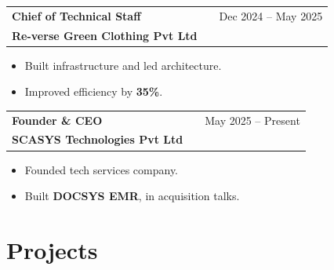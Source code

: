 \documentclass[a4paper,10pt]{article}
\begin{document}
\begin{tabularx}{\linewidth}{ @{}l X r@{} }

\textbf{Chief of Technical Staff} & \hfill & {\color[HTML]{371e77} Dec 2024 -- May 2025} \\

{\color[HTML]{371e77} \textbf{Re-verse Green Clothing Pvt Ltd}} & & \\

\end{tabularx}



\vspace{-6pt}

\begin{itemize}[nosep, leftmargin=1.5em]

\item Built infrastructure and led architecture.

\item Improved efficiency by \textbf{35\%}.

\end{itemize}



\begin{tabularx}{\linewidth}{ @{}l X r@{} }

\textbf{Founder \& CEO} & \hfill & {\color[HTML]{371e77} May 2025 -- Present} \\

{\color[HTML]{371e77} \textbf{SCASYS Technologies Pvt Ltd}} & & \\

\end{tabularx}



\vspace{-6pt}

\begin{itemize}[nosep, leftmargin=1.5em]

\item Founded tech services company.

\item Built \textbf{DOCSYS EMR}, in acquisition talks.

\end{itemize}




\section{Projects}
\end{document}

